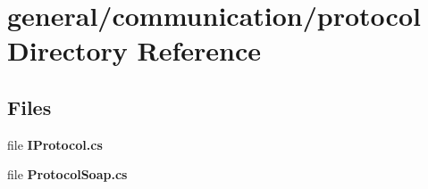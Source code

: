 \section{general/communication/protocol Directory Reference}
\label{dir_7380c575865c24a15b683289ea304687}
\subsection*{Files}
\begin{DoxyCompactItemize}
\item 
file {\bf I\-Protocol.\-cs}
\item 
file {\bf Protocol\-Soap.\-cs}
\end{DoxyCompactItemize}
